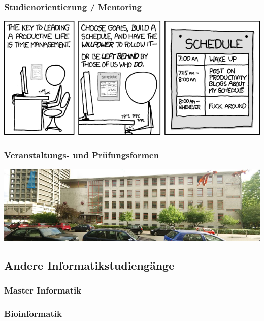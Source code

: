 \documentclass[12pt,a4paper]{scrartcl}
\begin{document}
\subsubsection{Studienorientierung / Mentoring}

\begin{center}
	\includegraphics[scale=0.8]{comics/time_management.png}
\end{center}
\newpage
\subsubsection{Veranstaltungs- und Prüfungsformen}



	\begin{center}
		\includegraphics[scale=1.0]{bilder/rm_pano}
	\end{center}
\subsection{Andere Informatikstudiengänge}
	\subsubsection{Master Informatik}
	
	\subsubsection{Bioinformatik}
    	
\end{document}
